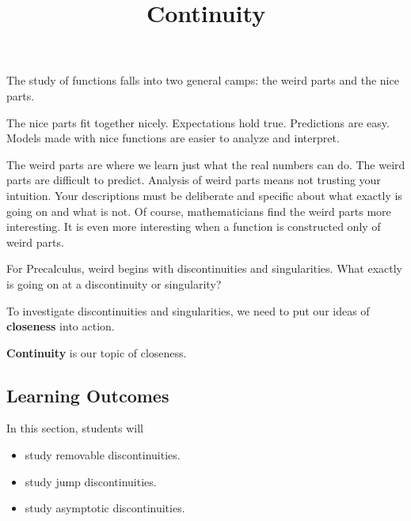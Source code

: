 \documentclass{ximera}
\title{Continuity}
\begin{document}
\begin{abstract}
\end{abstract}
\maketitle






The study of functions falls into two general camps: the weird parts and the nice parts.  

The nice parts fit together nicely. Expectations hold true. Predictions are easy. Models made with nice functions are easier to analyze and interpret.


The weird parts are where we learn just what the real numbers can do.  The weird parts are difficult to predict. Analysis of weird parts means not trusting your intuition.  Your descriptions must be deliberate and specific about what exactly is going on and what is not.  Of course, mathematicians find the weird parts more interesting.  It is even more interesting when a function is constructed only of weird parts.


For Precalculus, weird begins with discontinuities and singularities.  What exactly is going on at a discontinuity or singularity?


To investigate discontinuities and singularities, we need to put our ideas of \textbf{closeness} into action.

\textbf{Continuity} is our topic of closeness.


\subsection*{Learning Outcomes}


\begin{sectionOutcomes}
In this section, students will 

\begin{itemize}
\item study removable discontinuities.
\item study jump discontinuities.
\item study asymptotic discontinuities.

\end{itemize}
\end{sectionOutcomes}
\end{document}
